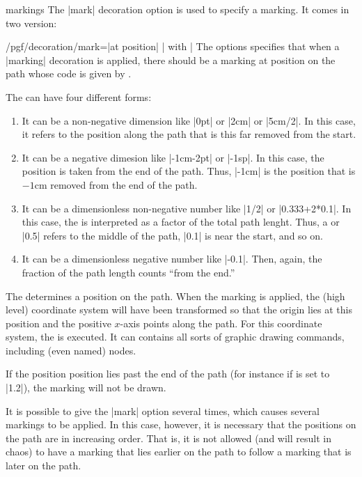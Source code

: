 \begin{decoration}{markings}
  The |mark| decoration option is used to specify a marking. It comes
  in two version:
  \begin{key}{/pgf/decoration/mark=|at position|
      | with |}
    The options specifies that when a |marking| decoration is applied,
    there should be a marking at position  on the path whose
    code is given by .

    The  can have four different forms:
    \begin{enumerate}
    \item It can be a non-negative dimension like |0pt| or |2cm| or
      |5cm/2|. In this case, it refers to the position along the path
      that is this far removed from the start.
    \item It can be a negative dimesion like |-1cm-2pt| or |-1sp|. In
      this case, the position is taken from the end of the path. Thus,
      |-1cm| is the position that is $-1$cm removed from the end of
      the path.
    \item It can be a dimensionless non-negative number like |1/2| or
      |0.333+2*0.1|. In this case, the  is interpreted as a
      factor of the total path lenght. Thus, a  or |0.5|
      refers to the middle of the path, |0.1| is near the start, and
      so on.
    \item It can be a dimensionless negative number like |-0.1|. Then,
      again, the fraction of the path length counts ``from the end.''
    \end{enumerate}

    The  determines a position on the path. When the marking
    is applied, the (high level) coordinate system will have been
    transformed so that the origin lies at this position and the
    positive $x$-axis points along the path. For this coordinate
    system, the  is executed. It can contains all sorts of
    graphic drawing commands, including (even named) nodes.

    If the position position lies past the end of the path (for
    instance if  is set to |1.2|), the marking will not be
    drawn.

    It is possible to give the |mark| option several times, which
    causes several markings to be applied. In this case, however, it
    is necessary that the positions on the path are in increasing
    order. That is, it is not allowed (and will result in chaos) to
    have a marking that lies earlier on the path to follow a marking
    that is later on the path.


\end{key}
\end{decoration}
